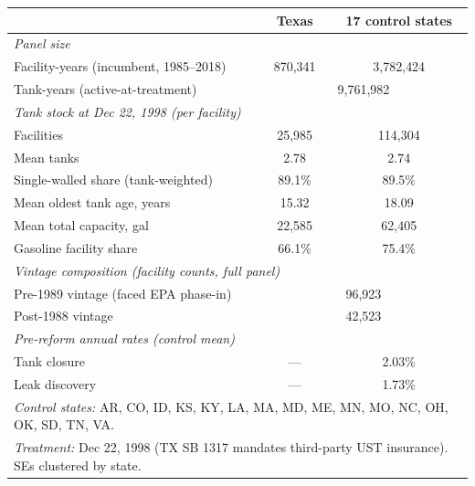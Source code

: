 \small
\renewcommand{\arraystretch}{1.1}
\begin{tabular}{lcc}
\toprule
 & Texas & 17 control states \\
\midrule
\multicolumn{3}{l}{\textit{Panel size}} \\
Facility-years (incumbent, 1985--2018) & 870{,}341 & 3{,}782{,}424 \\
Tank-years (active-at-treatment)       & \multicolumn{2}{c}{9{,}761{,}982} \\
\midrule
\multicolumn{3}{l}{\textit{Tank stock at Dec 22, 1998 (per facility)}} \\
Facilities                             & 25,985 & 114,304 \\
Mean tanks                             & 2.78 & 2.74 \\
Single-walled share (tank-weighted)    & 89.1\% & 89.5\% \\
Mean oldest tank age, years            & 15.32 & 18.09 \\
Mean total capacity, gal               & 22,585 & 62,405 \\
Gasoline facility share                & 66.1\% & 75.4\% \\
\midrule
\multicolumn{3}{l}{\textit{Vintage composition (facility counts, full panel)}} \\
Pre-1989 vintage (faced EPA phase-in)   & \multicolumn{2}{c}{96{,}923} \\
Post-1988 vintage                       & \multicolumn{2}{c}{42{,}523} \\
\midrule
\multicolumn{3}{l}{\textit{Pre-reform annual rates (control mean)}} \\
Tank closure                            & --- & 2.03\%  \\
Leak discovery                          & --- & 1.73\%  \\
\midrule
\multicolumn{3}{p{0.86\linewidth}}{\textit{Control states:} AR, CO, ID, KS, KY, LA, MA, MD, ME, MN, MO, NC, OH, OK, SD, TN, VA.} \\
\multicolumn{3}{p{0.86\linewidth}}{\textit{Treatment:} Dec 22, 1998 (TX SB 1317 mandates third-party UST insurance). SEs clustered by state.} \\
\bottomrule
\end{tabular}
